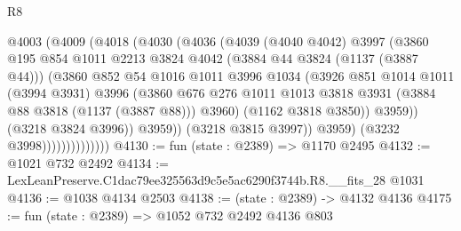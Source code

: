 \begin{lexlean}{R8}
\begin{coremodule}
                            @4003
                              (@4009
                                (@4018
                                  (@4030
                                    (@4036
                                      (@4039
                                        (@4040 @4042)
                                        @3997
                                        (@3860
                                          @195
                                          @854
                                          @1011
                                          @2213
                                          @3824
                                          @4042
                                          (@3884 @44 @3824 (@1137 (@3887 @44)))
                                          (@3860
                                            @852
                                            @54
                                            @1016
                                            @1011
                                            @3996
                                            @1034
                                            (@3926
                                              @851
                                              @1014
                                              @1011
                                              (@3994 @3931)
                                              @3996
                                              (@3860
                                                @676
                                                @276
                                                @1011
                                                @1013
                                                @3818
                                                @3931
                                                (@3884 @88 @3818 (@1137 (@3887 @88)))
                                                @3960)
                                              (@1162 @3818 @3850))
                                            @3959))
                                        (@3218 @3824 @3996))
                                      @3959))
                                  (@3218 @3815 @3997))
                                @3959)
                              (@3232 @3998))))))))))))))
@4130 := fun (state : @2389) => @1170 @2495
@4132 := @1021 @732 @2492
@4134 := LexLeanPreserve.C1dac79ee325563d9c5e5ac6290f3744b.R8.__fits_28 @1031
@4136 := @1038 @4134 @2503
@4138 := (state : @2389) -> @4132 @4136
@4175 := fun (state : @2389) =>
  @1052
    @732
    @2492
    @4136
    @803

\end{coremodule}
\end{lexlean}
